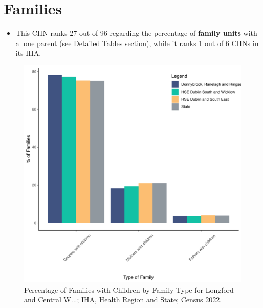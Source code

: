 \documentclass{article}
\begin{document}
\section{Families}\label{sect:Fam}
\begin{itemize}
\item This CHN ranks  27 out of 96 regarding the percentage of \textbf{family units} with a lone parent (see Detailed Tables section), while it ranks   1 out of 6 CHNs in its IHA.
\end{itemize}
\begin{figure}[H]
	\centering
	\includegraphics[width = 150mm]{../figures/FamED.pdf}
	\caption{Percentage of Families with Children by Family Type for Longford and Central W...; IHA, Health Region and State; Census 2022.}
	\label{fig:vbnv}
	\end{figure}
	
\end{document}
